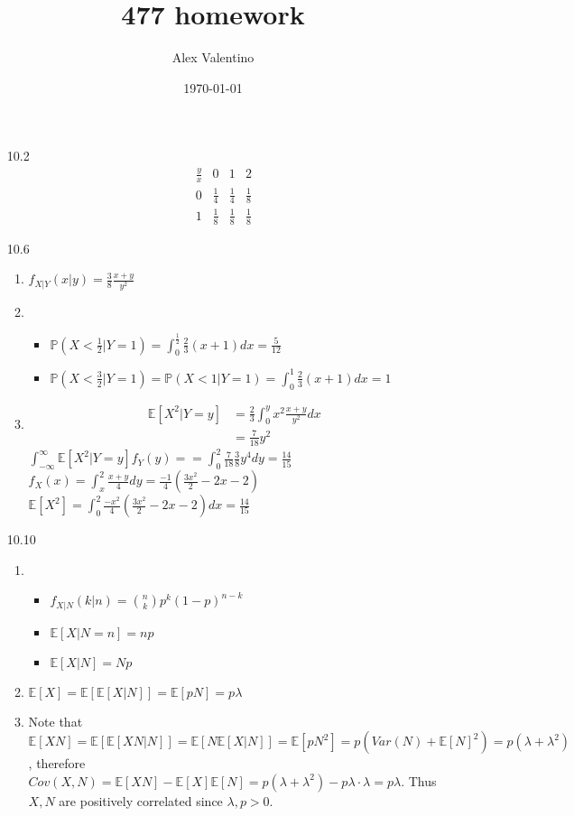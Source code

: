 \documentclass[12pt, letterpaper]{article}
\date{\today}
\author{Alex Valentino}
\title{477 homework}
\newcommand{\E}{\mathbb{E}}
\newcommand{\Pro}{\mathbb{P}}
\begin{document}
\begin{enumerate}
	\item[10.2]
	$$\begin{array}{c|ccc}
	\frac{y}{x} & 0 & 1 & 2\\
		0 & \frac{1}{4} & \frac{1}{4} & \frac{1}{8}\\
		1 & \frac{1}{8}& \frac{1}{8}& \frac{1}{8}
	\end{array}$$
	\item[10.6]
	\begin{enumerate}
		\item $f_{X|Y}(x|y) = \frac{3}{8} \frac{x+y}{y^2}$
		\item \begin{itemize}
			\item $\Pro(X < \frac{1}{2} | Y = 1) = \int_0^\frac{1}{2} \frac{2}{3}(x+1)dx = \frac{5}{12}$
			\item $\Pro(X < \frac{3}{2} | Y = 1) = \Pro(X < 1 | Y = 1) = \int_0^1 \frac{2}{3}(x+1)dx = 1$
		\end{itemize}
		\item \begin{align*}
			\E[X^2 | Y=y] &= \frac{2}{3}\int_0^y x^2 \frac{x+y}{y^2}dx\\
			&= \frac{7}{18}y^2
		\end{align*}
		$\int_{-\infty}^\infty \E[X^2 | Y=y] f_Y(y) = 
		= \int_0^2 \frac{7}{18} \frac{3}{8}y^4 dy 
		= \frac{14}{15}$\\
		$f_X(x) = \int_x^2 \frac{x+y}{4} dy = 
		\frac{-1}{4}(\frac{3x^2}{2} -2x - 2)$\\
		$\E[X^2] = \int_0^2 \frac{-x^2}{4}(\frac{3x^2}{2} -2x - 2)dx = \frac{14}{15}$
	\end{enumerate}
	\item[10.10] 
	\begin{enumerate}
		\item 
		\begin{itemize}
			\item $f_{X |N}(k|n) = \binom{n}{k}p^k (1-p)^{n-k}$
			\item $\E[X | N = n] = np$
			\item $\E[X|N] = Np$
		\end{itemize}
		\item $\E[X] = \E[\E[X|N]] = \E[pN] = p\lambda$
		\item Note that $\E[XN] = \E[\E[XN|N]] = \E[N \E[X|N]] = \E[pN^2] = p(Var(N) + \E[N]^2) = p(\lambda + \lambda^2)$, therefore \\
		$Cov(X,N) = \E[XN] - \E[X]\E[N] = p(\lambda + \lambda^2) - p\lambda \cdot \lambda = p \lambda$.  Thus $X,N$ are positively correlated since $\lambda, p >0$.

\end{enumerate}
\end{enumerate}
\end{document}
